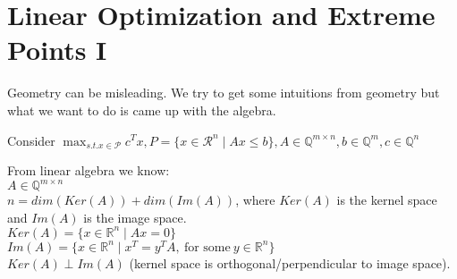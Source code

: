 \documentclass[main]{subfiles}
\begin{document}

\section{Linear Optimization and Extreme Points I}
Geometry can be misleading. We try to get some intuitions from geometry but
what we want to do is came up with the algebra.

Consider $\displaystyle \max_{s.t. x \in \mathcal{P}} c^{T}x, P = \{ x \in
\mathcal{R}^{n} \mid Ax \leq b \}, A \in \mathbb{Q}^{m \times n}, b \in
\mathbb{Q}^{m}, c \in \mathbb{Q}^{n}$

From linear algebra we know:\\
$A \in \mathbb{Q}^{m \times n}$\\
$n = dim(Ker(A)) + dim(Im(A))$, where $Ker(A)$ is the kernel space and $Im(A)$
is the image space.\\
$Ker(A) = \{ x \in \mathbb{R}^{n} \mid Ax = 0 \}$ \\
$Im(A) = \{ x \in \mathbb{R}^{n} \mid x^{T} = y^{T}A,\ \text{for some}\ y \in
\mathbb{R}^{n} \}$ \\
$Ker(A) \perp Im(A)$ (kernel space is orthogonal/perpendicular to image space).
\end{document}
